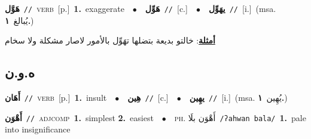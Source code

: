 \documentclass[10pt,a4paper,twoside]{article} %
\begin{document}
\begin{multicols}{2}
{\setlength\topsep{0pt}\textbf{\foreignlanguage{arabic}{هَوَّل}}\ {\color{gray}\texttt{//}\color{black}}\ \textsc{verb}\ [p.]\ \textbf{1.}~exaggerate\ \ $\bullet$\ \ \setlength\topsep{0pt}\textbf{\foreignlanguage{arabic}{هَوِّل}}\ {\color{gray}\texttt{//}\color{black}}\ [c.]\ \ $\bullet$\ \ \setlength\topsep{0pt}\textbf{\foreignlanguage{arabic}{يهَوِّل}}\ {\color{gray}\texttt{//}\color{black}}\ [i.]\ \color{gray}(msa. \foreignlanguage{arabic}{يُبالغ}~\foreignlanguage{arabic}{\textbf{١.}})\color{black}\  \begin{flushright}\color{gray}\foreignlanguage{arabic}{\textbf{\underline{\foreignlanguage{arabic}{أمثلة}}}: خالتو بديعة بتضلها تهَوِّل بالأمور لاصار مشكلة ولا سخام}\end{flushright}\color{black}} \vspace{2mm}

\vspace{-3mm}
\subsection*{\color{blue}\foreignlanguage{arabic}{ه.و.ن}\color{blue}{}} 

{\setlength\topsep{0pt}\textbf{\foreignlanguage{arabic}{أَهَان}}\ {\color{gray}\texttt{//}\color{black}}\ \textsc{verb}\ [p.]\ \textbf{1.}~insult\ \ $\bullet$\ \ \setlength\topsep{0pt}\textbf{\foreignlanguage{arabic}{هِين}}\ {\color{gray}\texttt{//}\color{black}}\ [c.]\ \ $\bullet$\ \ \setlength\topsep{0pt}\textbf{\foreignlanguage{arabic}{يهِين}}\ {\color{gray}\texttt{//}\color{black}}\ [i.]\ \color{gray}(msa. \foreignlanguage{arabic}{يُهِين}~\foreignlanguage{arabic}{\textbf{١.}})\color{black}\ } \vspace{2mm}

{\setlength\topsep{0pt}\textbf{\foreignlanguage{arabic}{أَهْوَن}}\ {\color{gray}\texttt{//}\color{black}}\ \textsc{adj\textunderscore comp}\ \textbf{1.}~simplest  \textbf{2.}~easiest\ \ $\bullet$\ \ \textsc{ph.} \color{gray} \foreignlanguage{arabic}{أَهْوَن بلَا}\color{black}\ {\color{gray}\texttt{/{\sffamily ʔahwan bala}/}\color{black}}\ \textbf{1.}~pale into insignificance\ } \vspace{2mm}


\end{multicols}
\end{document}
